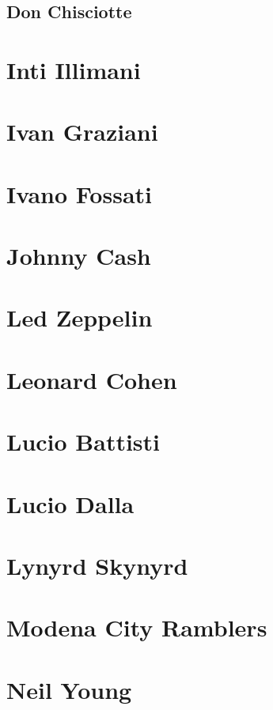 \section{Don Chisciotte}

\chapter{Inti Illimani}

\chapter{Ivan Graziani}

\chapter{Ivano Fossati}

\chapter{Johnny Cash}

\chapter{Led Zeppelin}

\chapter{Leonard Cohen}

\chapter{Lucio Battisti}

\chapter{Lucio Dalla}

\chapter{Lynyrd Skynyrd}

\chapter{Modena City Ramblers}

\chapter{Neil Young}


